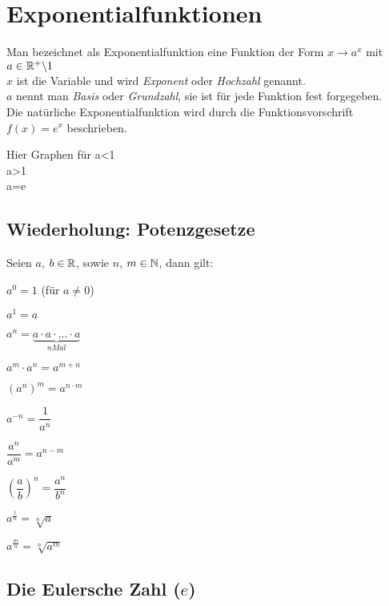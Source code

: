 \chapter{Exponentialfunktionen}

\begin{Definition}
Man bezeichnet als Exponentialfunktion eine Funktion der Form $x\rightarrow a^x$ mit $a\in \mathbb{R}^+\backslash 1$\\
$x$ ist die Variable und wird \textit{Exponent} oder \textit{Hochzahl} genannt.\\
$a$ nennt man \textit{Basis} oder \textit{Grundzahl}, sie ist für jede Funktion fest forgegeben.\\
Die natürliche Exponentialfunktion wird durch die Funktionsvorschrift $f(x)=e^x$ beschrieben.
\end{Definition}

Hier Graphen für a<1\\
a>1\\
a=e\\


		\section{Wiederholung: Potenzgesetze}
Seien $a$, $b\in\mathbb{R}$, sowie $n$, $m\in\mathbb{N}$, dann gilt:
\begin{enumerate}
\begin{minipage}{0.5\textwidth}
\item$a^0=1$ (für $a\neq 0$)
\item$a^1=a$
\item$a^n=\underbrace{a\cdot a\cdot ... \cdot a}_{n Mal}$
\item$a^m\cdot a^n=a^{m+n}$
\item$(a^n)^m=a^{n\cdot m}$
\end {minipage}
\begin{minipage}{0.5\textwidth}
\item$a^{-n}=\dfrac{1}{a^n}$
\item$\dfrac{a^n}{a^m}=a^{n-m}$
\item$\left(\dfrac{a}{b}\right)^n=\dfrac{a^n}{b^n}$
\item $a^{\frac{1}{n}}=\sqrt[n]{a}$
\item$a^{\frac{m}{n}}=\sqrt[n]{a^m}$
\end {minipage}
\end{enumerate}

		\section{Die Eulersche Zahl ($e$)}

